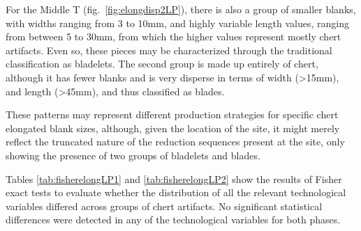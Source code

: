 \documentclass[12pt,twoside]{reedthesis}
\begin{document}
For the Middle T (fig.~\ref{fig:elongdisp2LP}), there is also a group of smaller blanks, with widths ranging from 3 to 10mm, and highly variable length values, ranging from between 5 to 30mm, from which the higher values represent mostly chert artifacts. Even so, these pieces may be characterized through the traditional classification as bladelets. The second group is made up entirely of chert, although it has fewer blanks and is very disperse in terms of width (\textgreater15mm), and length (\textgreater45mm), and thus classified as blades.

These patterns may represent different production strategies for specific chert elongated blank sizes, although, given the location of the site, it might merely reflect the truncated nature of the reduction sequences present at the site, only showing the presence of two groups of bladelets and blades.

Tables \ref{tab:fisherelongLP1} and \ref{tab:fisherelongLP2} show the results of Fisher exact tests to evaluate whether the distribution of all the relevant technological variables differed across groups of chert artifacts. No significant statistical differences were detected in any of the technological variables for both phases.
\end{document}
